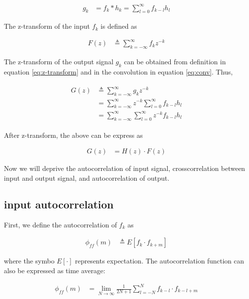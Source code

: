 \documentclass[8pt,a4paper]{article}
\begin{document}
\begin{multicols}{2}
\begin{align}
\label{eq:conv}
  g_{k} &= f_{k} * h_{k} 
        = \sum_{l=0}^{\infty} f_{k-l}h_{l} 
\end{align}

The z-transform of the input $f_{k}$ is defined as

\begin{align}
  \label{eq:z-transform}
  F(z)&\triangleq \sum_{k=-\infty}^{\infty} f_{k}z^{-k}
\end{align}

The z-transform of the output signal $g_{k}$ can be obtained from definition in equation \ref{eq:z-transform} and in the convolution in equation \ref{eq:conv}. Thus, 

\begin{align}
  \begin{split}
  G(z)&\triangleq \sum_{k=-\infty}^{\infty} g_{k}z^{-k}\\
      &=\sum_{k=-\infty}^{\infty} z^{-k} \sum_{l=0}^{\infty} f_{k-l}h_{l} \\
      &=\sum_{k=-\infty}^{\infty} \sum_{l=0}^{\infty} z^{-k}f_{k-l}h_{l}
  \end{split}
\end{align}

After z-transform, the above can be express as

\begin{align}
  G(z) &= H(z) \cdot F(z)
\end{align}

Now we will deprive the autocorrelation of input signal, crosscorrelation between input and output signal, and autocorrelation of output. 

\subsection*{input autocorrelation}
First, we define the autocorrelation of $f_{k}$ as

\begin{align}
  \phi_{ff}(m) &\triangleq E \left[ f_{k} \cdot f_{k+m} \right]
\end{align}

where the symbo $E[\cdot]$ represents expectation. The autocorrelation function can also be expressed as time average:

\begin{align}
  \phi_{ff}(m) &= \lim_{N\rightarrow\infty} \frac{1}{2N+1} \sum_{l=-N}^{N} f_{k-l} \cdot f_{k-l+m}
\end{align}


\end{multicols}
\end{document}
